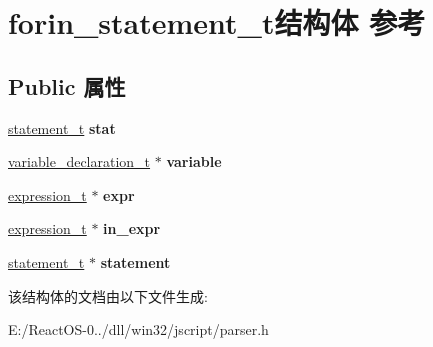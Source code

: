 \hypertarget{structforin__statement__t}{}\section{forin\+\_\+statement\+\_\+t结构体 参考}
\label{structforin__statement__t}
\subsection*{Public 属性}
\begin{DoxyCompactItemize}
\item 
\mbox{\label{structforin__statement__t_a6b703f32bbcca60fda419f71298201cb}} 
\hyperlink{struct__statement__t}{statement\+\_\+t} {\bfseries stat}
\item 
\mbox{\label{structforin__statement__t_a5e392b06686c567b62a7cae10f8529a3}} 
\hyperlink{struct__variable__declaration__t}{variable\+\_\+declaration\+\_\+t} $\ast$ {\bfseries variable}
\item 
\mbox{\label{structforin__statement__t_adc9859173256ae1d243c4d8efe0b7e04}} 
\hyperlink{struct__expression__t}{expression\+\_\+t} $\ast$ {\bfseries expr}
\item 
\mbox{\label{structforin__statement__t_ac82fe53c66e05040e224674a91d32f38}} 
\hyperlink{struct__expression__t}{expression\+\_\+t} $\ast$ {\bfseries in\+\_\+expr}
\item 
\mbox{\label{structforin__statement__t_aa41c54c94d8d59689fb6519f64105a7e}} 
\hyperlink{struct__statement__t}{statement\+\_\+t} $\ast$ {\bfseries statement}
\end{DoxyCompactItemize}


该结构体的文档由以下文件生成\+:\begin{DoxyCompactItemize}
\item 
E\+:/\+React\+O\+S-\/0../dll/win32/jscript/parser.\+h\end{DoxyCompactItemize}
